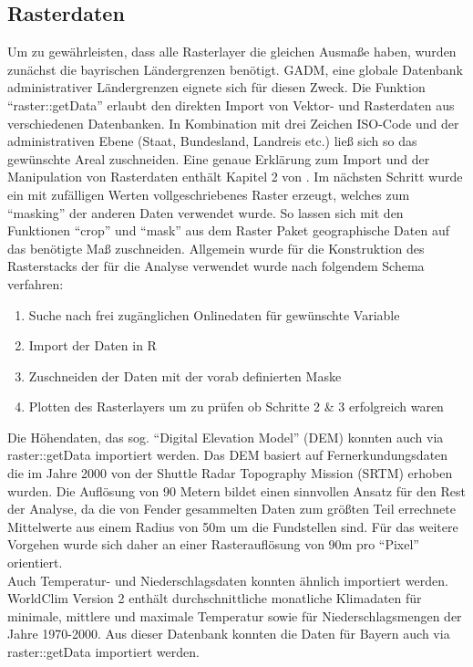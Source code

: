 \subsection{Rasterdaten}

Um zu gewährleisten, dass alle Rasterlayer die gleichen Ausmaße haben, wurden zunächst die bayrischen Ländergrenzen benötigt. GADM, \cite{GADM.org} eine globale Datenbank administrativer Ländergrenzen eignete sich für diesen Zweck. Die Funktion ``raster::getData'' erlaubt den direkten Import von Vektor- und Rasterdaten aus verschiedenen Datenbanken. In Kombination mit drei Zeichen ISO-Code und der administrativen Ebene (Staat, Bundesland, Landreis etc.) ließ sich so das gewünschte Areal zuschneiden. Eine genaue Erklärung zum Import und der Manipulation von Rasterdaten enthält Kapitel 2 von \cite{lovelace2019}. Im nächsten Schritt wurde ein mit zufälligen Werten vollgeschriebenes Raster erzeugt, welches zum ``masking'' der anderen Daten verwendet wurde. So lassen sich mit den Funktionen ``crop'' und ``mask'' aus dem Raster Paket geographische Daten auf das benötigte Maß zuschneiden. Allgemein wurde für die Konstruktion des Rasterstacks der für die Analyse verwendet wurde nach folgendem Schema verfahren: \\
\begin{enumerate}
    \item Suche nach frei zugänglichen Onlinedaten für gewünschte Variable
    \item Import der Daten in R
    \item Zuschneiden der Daten mit der vorab definierten Maske
    \item Plotten des Rasterlayers um zu prüfen ob Schritte 2 \& 3 erfolgreich waren
\end{enumerate}
Die Höhendaten, das sog. ``Digital Elevation Model'' (DEM) konnten auch via raster::getData importiert werden. Das DEM basiert auf Fernerkundungsdaten die im Jahre 2000 von der Shuttle Radar Topography Mission (SRTM) erhoben wurden. \cite{srtm} Die Auflösung von 90 Metern bildet einen sinnvollen Ansatz für den Rest der Analyse, da die von Fender gesammelten Daten zum größten Teil errechnete Mittelwerte aus einem Radius von 50m um die Fundstellen sind. Für das weitere Vorgehen wurde sich daher an einer Rasterauflösung von 90m pro ``Pixel'' orientiert. \\
Auch Temperatur- und Niederschlagsdaten konnten ähnlich importiert werden. WorldClim Version 2 enthält durchschnittliche monatliche Klimadaten für minimale, mittlere und maximale Temperatur sowie für Niederschlagsmengen der Jahre 1970-2000. \cite{Worldclim2} Aus dieser Datenbank konnten die Daten für Bayern auch via raster::getData importiert werden. \\
